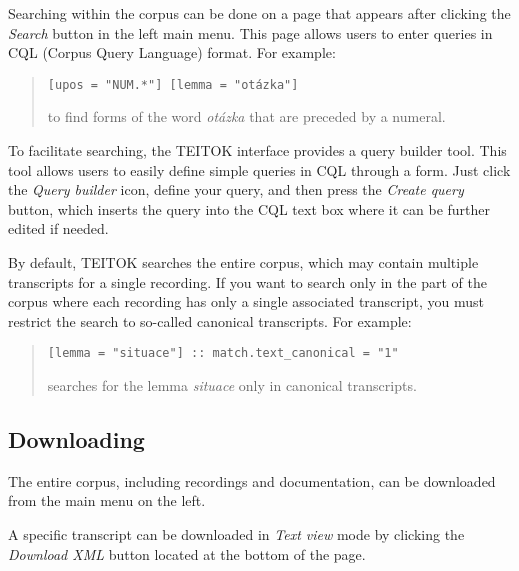 \documentclass[
]{article}
\begin{document}
Searching within the corpus can be done on a page that appears after
clicking the \emph{Search} button in the left main menu. This page
allows users to enter queries in CQL (Corpus Query Language) format. For
example:

\begin{quote}
\texttt{{[}upos\ =\ "NUM.*"{]}\ {[}lemma\ =\ "otázka"{]}}

to find forms of the word \emph{otázka} that are preceded by a numeral.
\end{quote}

To facilitate searching, the TEITOK interface provides a query builder
tool. This tool allows users to easily define simple queries in CQL
through a form. Just click the \emph{Query builder} icon, define your
query, and then press the \emph{Create query} button, which inserts the
query into the CQL text box where it can be further edited if needed.

By default, TEITOK searches the entire corpus, which may contain
multiple transcripts for a single recording. If you want to search only
in the part of the corpus where each recording has only a single
associated transcript, you must restrict the search to so-called
canonical transcripts. For example:

\begin{quote}
\texttt{{[}lemma\ =\ "situace"{]}\ ::\ match.text\_canonical\ =\ "1"}

searches for the lemma \emph{situace} only in canonical transcripts.
\end{quote}

\hypertarget{downloading}{%
\subsection{Downloading}\label{downloading}}

The entire corpus, including recordings and documentation, can be
downloaded from the main menu on the left.

A specific transcript can be downloaded in \emph{Text view} mode by
clicking the \emph{Download XML} button located at the bottom of the
page.
\end{document}
